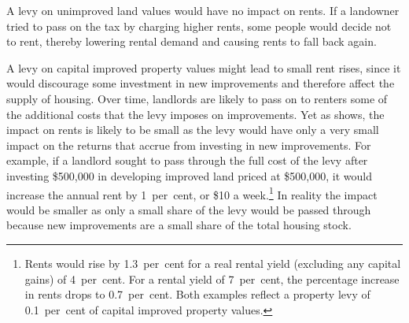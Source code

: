 \documentclass[twoside,english]{palatinob5ona4portrait}
\begin{document}
A levy on unimproved land values would have no impact on rents. If a landowner tried to pass on the tax by charging higher rents, some people would decide not to rent, thereby lowering rental demand and causing rents to fall back again.

A levy on capital improved property values might lead to small rent rises, since it would discourage some investment in new improvements and therefore affect the supply of housing. Over time, landlords are likely to pass on to renters some of the additional costs that the levy imposes on improvements. Yet as  shows, the impact on rents is likely to be small as the levy would have only a very small impact on the returns that accrue from investing in new improvements. For example, if a landlord sought to pass through the full cost of the levy after investing \$500,000 in developing improved land priced at \$500,000, it would increase the annual rent by 1~per~cent, or \$10 a week.\footnote{Rents would rise by 1.3~per~cent for a real rental yield (excluding any capital gains) of 4~per~cent. For a rental yield of 7~per~cent, the percentage increase in rents drops to 0.7~per~cent. Both examples reflect a property levy of 0.1~per~cent of capital improved property values.}  In reality the impact would be smaller as only a small share of the levy would be passed through because new improvements are a small share of the total housing stock.
\end{document}
